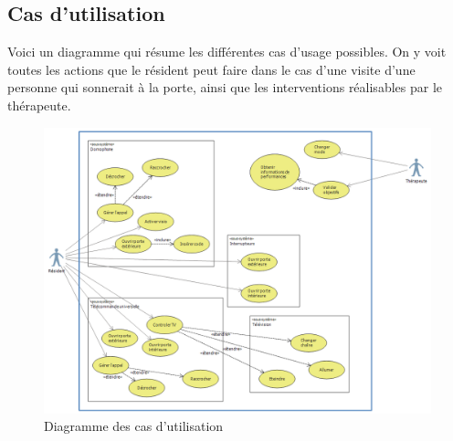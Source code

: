 \subsection{Cas d'utilisation}
Voici un diagramme qui résume les différentes cas d'usage possibles. On y voit toutes les actions que le résident peut faire dans le cas d'une visite d'une personne qui sonnerait à la porte, ainsi que les interventions réalisables par le thérapeute.
\begin{figure}[h]
  \caption{Diagramme des cas d'utilisation}
  \includegraphics[width=\linewidth]{1-PreEtude/img/diagramme}
\end{figure}
